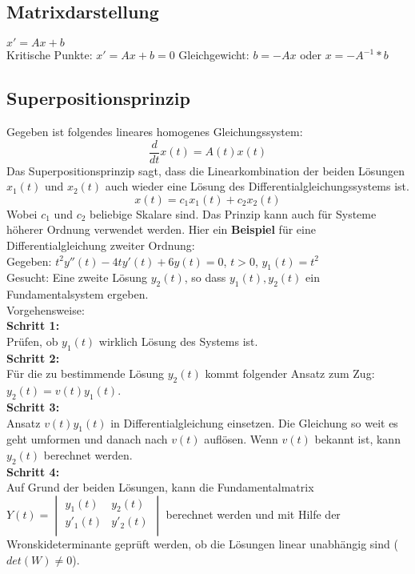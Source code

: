 \subsection{Matrixdarstellung}
$x' = Ax + b$\\
Kritische Punkte: $x' = Ax + b = 0$ Gleichgewicht: $b = -Ax$ oder $x = -A^{-1}*b$\\


\subsection{Superpositionsprinzip}
Gegeben ist folgendes lineares homogenes Gleichungssystem:
\begin{equation*}
\frac{d}{dt}x(t) = A(t)x(t)
\end{equation*}
Das Superpositionsprinzip sagt, dass die Linearkombination der beiden Lösungen $x_1(t)$ und $x_2(t)$ auch wieder eine Lösung des Differentialgleichungssystems ist. 
\begin{equation*}
	x(t) = c_1 x_1(t) + c_2 x_2(t)
\end{equation*}
Wobei $c_1$ und $c_2$ beliebige Skalare sind. 
Das Prinzip kann auch für Systeme höherer Ordnung verwendet werden. Hier ein \textbf{Beispiel} für eine Differentialgleichung zweiter Ordnung: \\
Gegeben: $t^2y''(t)-4ty'(t)+6y(t)=0$, $t>0$, $y_1(t)=t^2$\\
Gesucht: Eine zweite Lösung $y_2(t)$, so dass ${y_1(t),y_2(t)}$ ein Fundamentalsystem ergeben. \\
Vorgehensweise: \\
\textbf{Schritt 1:}\\
Prüfen, ob $y_1(t)$ wirklich Lösung des Systems ist. \\
\textbf{Schritt 2:}\\
Für die zu bestimmende Lösung $y_2(t)$ kommt folgender Ansatz zum Zug: $y_2(t) = v(t)y_1(t)$.\\
\textbf{Schritt 3:}\\
Ansatz $v(t)y_1(t)$ in Differentialgleichung einsetzen. Die Gleichung so weit es geht umformen und danach nach $v(t)$ auflösen. Wenn $v(t)$ bekannt ist, kann $y_2(t)$ berechnet werden. \\
\textbf{Schritt 4:}\\
Auf Grund der beiden Lösungen, kann die Fundamentalmatrix $Y(t) =
\begin{vmatrix} 
	        y_{1}(t) & y_{2}(t)\\ 
	        y'_{1}(t) & y'_{2}(t)\\   
\end{vmatrix} $ berechnet werden und mit Hilfe der Wronskideterminante geprüft werden, ob die Lösungen linear unabhängig sind ($det(W) \neq 0$). 
